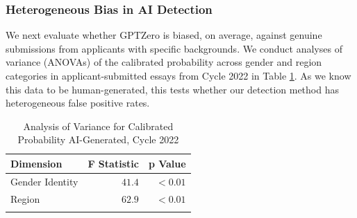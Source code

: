 \subsubsection{Heterogeneous Bias in AI Detection}
We next evaluate whether GPTZero is biased, on average, against genuine submissions from applicants with specific backgrounds. We conduct analyses of variance (ANOVAs) of the calibrated probability across gender and region categories in applicant-submitted essays from Cycle 2022 in Table \ref{tab:demo_anova}. As we know this data to be human-generated, this tests whether our detection method has heterogeneous false positive rates.

\begin{table}[htb]
    \centering
    \caption{Analysis of Variance for Calibrated Probability AI-Generated, Cycle 2022}
    \label{tab:demo_anova}
    \begin{tabular}{ l r r}
        \toprule
        Dimension & F Statistic & p Value \\
        \midrule
        Gender Identity & $41.4$ & $<0.01$ \\
        Region & $62.9$ & $<0.01$ \\
        \bottomrule\\
    \end{tabular}
\end{table}

